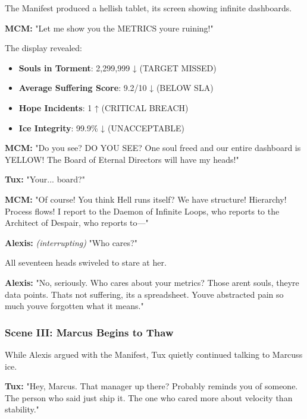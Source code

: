 The Manifest produced a hellish tablet, its screen showing infinite dashboards.

\textbf{MCM:} "Let me show you the METRICS you\textquotesingle re ruining!"

The display revealed:

\begin{itemize}
\tightlist
\item
  \textbf{Souls in Torment}: 2,299,999 ↓ (TARGET MISSED)
\item
  \textbf{Average Suffering Score}: 9.2/10 ↓ (BELOW SLA)
\item
  \textbf{Hope Incidents}: 1 ↑ (CRITICAL BREACH)
\item
  \textbf{Ice Integrity}: 99.9\% ↓ (UNACCEPTABLE)
\end{itemize}

\textbf{MCM:} "Do you see? DO YOU SEE? One soul freed and our entire dashboard is YELLOW! The Board of Eternal Directors will have my heads!"

\textbf{Tux:} "Your... board?"

\textbf{MCM:} "Of course! You think Hell runs itself? We have structure! Hierarchy! Process flows! I report to the Daemon of Infinite Loops, who reports to the Architect of Despair, who reports to---"

\textbf{Alexis:} \emph{(interrupting)} "Who cares?"

All seventeen heads swiveled to stare at her.

\textbf{Alexis:} "No, seriously. Who cares about your metrics? Those aren\textquotesingle t souls, they\textquotesingle re data points. That\textquotesingle s not suffering, it\textquotesingle s a spreadsheet. You\textquotesingle ve abstracted pain so much you\textquotesingle ve forgotten what it means."

\bookdivider

\subsubsection{Scene III: Marcus Begins to Thaw}\label{scene-iii-marcus-begins-to-thaw}

While Alexis argued with the Manifest, Tux quietly continued talking to Marcus\textquotesingle s ice.

\textbf{Tux:} "Hey, Marcus. That manager up there? Probably reminds you of someone. The person who said \textquotesingle just ship it.\textquotesingle{} The one who cared more about velocity than stability."

